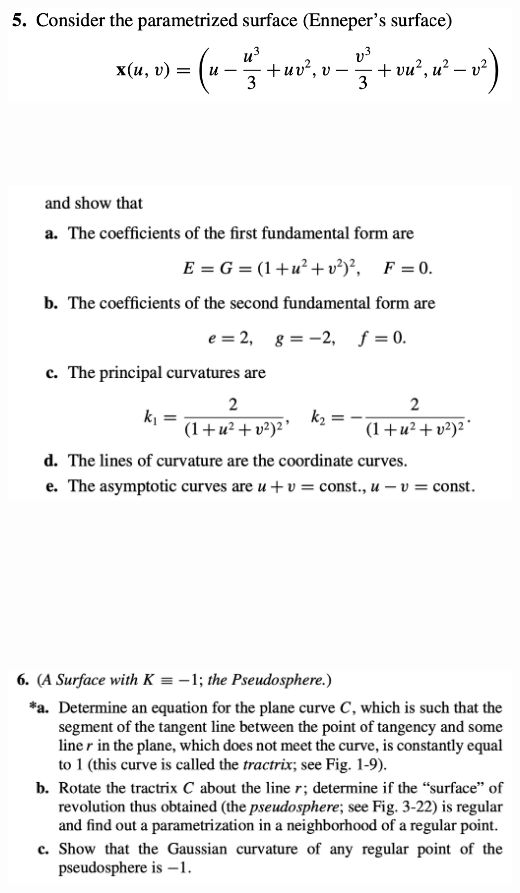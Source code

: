 \documentclass{report}
\begin{document}
\begin{question}{}{}
\includegraphics[height=3cm,width=18cm]{hw5q8}
\includegraphics[height=12cm,width=18cm]{hw5q8a}
\end{question}
\begin{question}{}{}
\includegraphics[height=10cm,width=18cm]{hw5q9}
\end{question}
\end{document}
